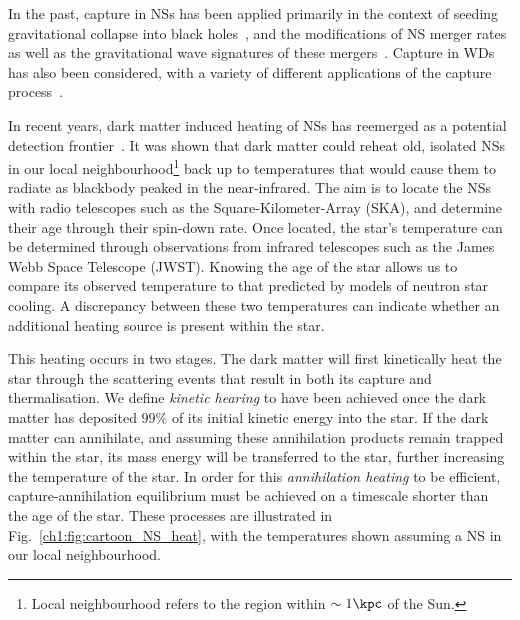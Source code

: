 In the past, capture in NSs has been applied primarily in the context of seeding gravitational collapse into black holes~\cite{McDermott:2011jp_ConstraintsScalarAsymmetric,Kouvaris:2011fi_ExcludingLightAsymmetric,Guver:2012ba_may_Capturedarkmatter, Garani:2018kkd_may_NewAnalysisNeutron,Bramante:2013nma_jan_Boundsselfinteractingfermion,Bertoni:2013bsa_dec_DarkMatterThermalization,Bell:2013xk_jun_Realisticneutronstar}, and the modifications of NS merger rates as well as the gravitational wave signatures of these mergers~\cite{Bramante:2017ulk_mar_SearchingDarkMatter, Ellis:2017jgp_jun_SearchDarkMatter, Ellis:2018bkr_jun_DarkMatterEffects,Nelson:2018xtr_jul_Darkhalosneutron}. Capture in WDs has also been considered, with a variety of different applications of the capture process~\cite{Steigerwald:2019efv_dec_DarkMatterThermonuclear, Panotopoulos:2020kuo_jun_Constraintslightdark, McCullough:2010ai_CaptureInelasticDark, Hooper:2010es_InelasticDarkMatter, Bramante:2015cua_sep_Darkmatterignition, Bertone:2007ae_CompactStarsDark}. 

In recent years, dark matter induced heating of NSs has reemerged as a potential detection frontier~\cite{Raj:2017wrv_feb_Neutronstarsdark, Baryakhtar:2017dbj_sep_DarkKineticHeating, Bell:2018pkk_sep_HeatingNeutronStars,Joglekar:2019vzy_sep_Relativisticcapturedark, Acevedo:2019agu_mar_WarmingNuclearPasta, Bell:2019pyc_jun_CaptureLeptophilicDark, Garani:2019fpa_aug_Darkmatterinteractions,Chatterjee:2022dhp_jul_Faintlightold}. It was shown that dark matter could reheat old, isolated NSs in our local neighbourhood\footnote{Local neighbourhood refers to the region within $\sim 1\kpc$ of the Sun.} back up to temperatures that would cause them to radiate as blackbody peaked in the near-infrared. 
The aim is to locate the NSs with radio telescopes such as the Square-Kilometer-Array (SKA), and determine their age through their spin-down rate. 
Once located, the star's temperature can be determined through observations from infrared telescopes such as the James Webb Space Telescope (JWST). Knowing the age of the star allows us to compare its observed temperature to that predicted by models of neutron star cooling. A discrepancy between these two temperatures can indicate whether an additional heating source is present within the star. 

This heating occurs in two stages. The dark matter will first kinetically heat the star through the scattering events that result in both its capture and thermalisation. We define \textit{kinetic hearing} to have been achieved once the dark matter has deposited $99\%$ of its initial kinetic energy into the star.
If the dark matter can annihilate, and assuming these annihilation products remain trapped within the star, its mass energy will be transferred to the star, further increasing the temperature of the star. In order for this \textit{annihilation heating} to be efficient, capture-annihilation equilibrium must be achieved on a timescale shorter than the age of the star. These processes are illustrated in Fig.~\ref{ch1:fig:cartoon_NS_heat}, with the temperatures shown assuming a NS in our local neighbourhood.


